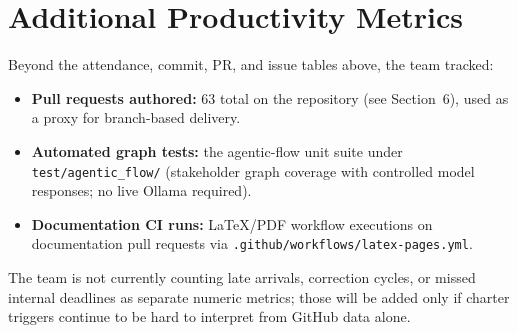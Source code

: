 \documentclass{article}
\begin{document}
\section{Additional Productivity Metrics}

Beyond the attendance, commit, PR, and issue tables above, the team tracked:

\begin{itemize}
  \item \textbf{Pull requests authored:} 63 total on the repository (see
    Section~6), used as a proxy for branch-based delivery.
  \item \textbf{Automated graph tests:} the agentic-flow unit suite under
    \texttt{test/agentic\_flow/} (stakeholder graph coverage with controlled
    model responses; no live Ollama required).
  \item \textbf{Documentation CI runs:} LaTeX/PDF workflow executions on
    documentation pull requests via
    \texttt{.github/workflows/latex-pages.yml}.
\end{itemize}

The team is not currently counting late arrivals, correction cycles, or missed
internal deadlines as separate numeric metrics; those will be added only if
charter triggers continue to be hard to interpret from GitHub data alone.
\end{document}
